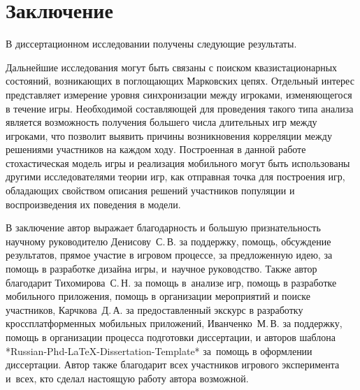\chapter*{Заключение}                       %


В диссертационном исследовании получены следующие результаты.


Дальнейшие исследования могут быть связаны с поиском квазистационарных состояний, возникающих в 
поглощающих Марковских цепях. Отдельный интерес представляет измерение уровня синхронизации между игроками,
изменяющегося в течение игры. Необходимой составляющей для проведения такого типа анализа 
является возможность получения большего числа длительных игр между игроками,
что позволит выявить причины возникновения корреляции между решениями участников на каждом ходу.
Построенная в данной работе стохастическая модель игры и реализация мобильного могут быть использованы другими исследователями теории игр,
как отправная точка для построения игр, обладающих свойством описания решений участников популяции 
и воспроизведения их поведения в модели. 

В заключение автор выражает благодарность и большую признательность научному руководителю
Денисову~С.\,В. за поддержку, помощь, обсуждение результатов, прямое участие в игровом процессе,
за предложенную идею, за помощь в разработке дизайна игры, и~научное руководство. Также автор благодарит Тихомирова~С.\,Н. 
за помощь в~анализе игр, помощь в разработке мобильного приложения, помощь в организации мероприятий и поиске участников, 
Карчкова~Д.\,А. за предоставленный экскурс в разработку кроссплатформенных мобильных приложений, 
Иванченко~М.\,В. за поддержку, помощь в организации процесса подготовки диссертации,
и авторов шаблона *Russian-Phd-LaTeX-Dissertation-Template* за~помощь в оформлении
диссертации. Автор также благодарит всех участников игрового эксперимента
и~всех, кто сделал настоящую работу автора возможной.

